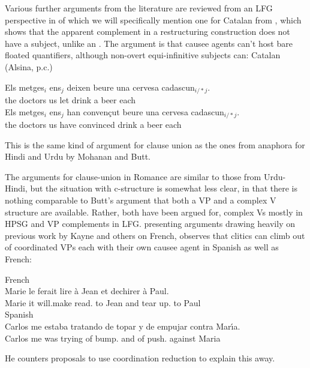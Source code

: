 \documentclass[output=paper,hidelinks]{langscibook}
\begin{document}
Various further arguments from the literature are reviewed from an LFG perspective in
\citet[47--59]{AndrewsManning1999} of which we will specifically mention one for
Catalan from \citet[217]{alsina1996the-role}, which shows that the apparent complement in a restructuring
construction does not have a subject, unlike an {\XCOMP}.  The argument is that causee agents can't
host bare floated quantifiers, although non-overt equi-infinitive subjects can:
\ea Catalan  (Alsina, p.c.)
\begin{xlist}
\ex
\gll Els metges$_i$ ens$_j$ deixen beure una cervesa cadascun$_{i/*j}$.\\
the doctors us let drink a beer each\\
\ex
\gll Els metges$_i$ ens$_j$ han conven\c cut beure una cervesa cadascun$_{i/*j}$.\\
the doctors us have convinced drink a beer each \\
\end{xlist}
\z
This is the same kind of argument for clause union as the ones from anaphora for
Hindi and Urdu by Mohanan and Butt.

The arguments for clause-union in Romance are similar to those from Urdu-Hindi, but
the situation with c-structure is somewhat less clear, in that there
is nothing comparable to Butt's argument that both a VP and a complex
V structure are available.  Rather, both have been argued for, complex
Vs mostly in HPSG \citep{AbeilleGodard1994,AbeilleGodard1996} and VP
complements in LFG.  \citet{Manning1992,Manning1996rcp} presenting
arguments drawing heavily on previous work by Kayne and others on
French, observes that clitics can climb out of coordinated VPs each
with their own causee agent in Spanish as well as French:
\ea
\begin{xlist}
\ex French\\
\gll Marie le ferait lire \`a Jean et dechirer \`a Paul.\\
Marie it will.make read.{\INF} to Jean and {tear up}.{\INF} to Paul\\
\ex Spanish\\
\gll Carlos me estaba tratando de topar y de empujar contra Mar\'\i a.\\
Carlos me was trying of bump.{\INF} and of push.{\INF} against Maria\\
\end{xlist}
\z
He counters proposals to use coordination reduction to explain this away.
\end{document}

